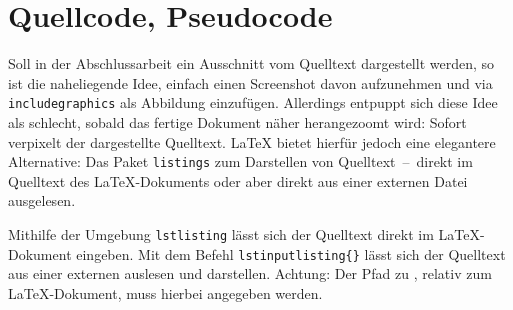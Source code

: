 \section{Quellcode, Pseudocode}
\label{sec:listing}
%
%
Soll in der Abschlussarbeit ein Ausschnitt vom Quelltext dargestellt werden, so ist die naheliegende Idee, einfach einen Screenshot davon aufzunehmen und via \texttt{\tb includegraphics} als Abbildung einzufügen. Allerdings entpuppt sich diese Idee als schlecht, sobald das fertige Dokument näher herangezoomt wird: Sofort verpixelt der dargestellte Quelltext. \LaTeX{} bietet hierfür jedoch eine elegantere Alternative: Das Paket \texttt{listings} zum Darstellen von Quelltext~--~direkt im Quelltext des \LaTeX-Dokuments oder aber direkt aus einer externen Datei ausgelesen.

Mithilfe der Umgebung \texttt{lstlisting} lässt sich der Quelltext direkt im \LaTeX-Dokument eingeben. Mit dem Befehl \texttt{\tb lstinputlisting\{\}} lässt sich der Quelltext aus einer externen  auslesen und darstellen. Achtung: Der Pfad zu , relativ zum \LaTeX-Dokument, muss hierbei angegeben werden.


